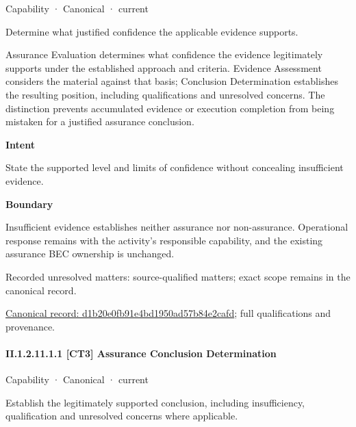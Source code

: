 \label{element:d1b20e0fb91e4bd1950ad57b84e2cafd}
{\small Capability · Canonical · current}\par

Determine what justified confidence the applicable evidence supports.



Assurance Evaluation determines what confidence the evidence legitimately supports under the established approach and criteria. Evidence Assessment considers the material against that basis; Conclusion Determination establishes the resulting position, including qualifications and unresolved concerns. The distinction prevents accumulated evidence or execution completion from being mistaken for a justified assurance conclusion.



\textbf{Intent}



State the supported level and limits of confidence without concealing insufficient evidence.



\textbf{Boundary}



Insufficient evidence establishes neither assurance nor non-assurance. Operational response remains with the activity's responsible capability, and the existing assurance BEC ownership is unchanged.


{\small Recorded unresolved matters: source-qualified matters; exact scope remains in the canonical record.}\par
{\footnotesize \href{../../../../continuum/strategy/capability/d1b20e0fb91e4bd1950ad57b84e2cafd.md}{Canonical record: d1b20e0fb91e4bd1950ad57b84e2cafd}; full qualifications and provenance.}\par
\paragraph*{II.1.2.11.1.1 [CT3] Assurance Conclusion Determination}
\label{navigation:II.1.2.11.1.1}

\label{element:10f538feae4042829fafeae472882128}
{\small Capability · Canonical · current}\par

Establish the legitimately supported conclusion, including insufficiency, qualification and unresolved concerns where applicable.



